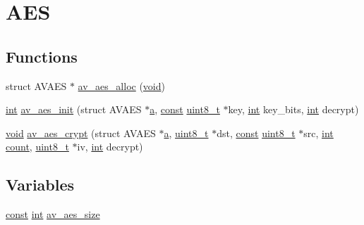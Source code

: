 \hypertarget{group__lavu__aes}{}\section{A\+ES}
\label{group__lavu__aes}
\subsection*{Functions}
\begin{DoxyCompactItemize}
\item 
struct A\+V\+A\+ES $\ast$ \hyperlink{group__lavu__aes_ga82fd4287891dc9fe98ecfe26e1a66bbb}{av\+\_\+aes\+\_\+alloc} (\hyperlink{sound_8c_ae35f5844602719cf66324f4de2a658b3}{void})
\item 
\hyperlink{xmltok_8h_a5a0d4a5641ce434f1d23533f2b2e6653}{int} \hyperlink{group__lavu__aes_ga54975ad71f0eab2287e3e94d561d0aa4}{av\+\_\+aes\+\_\+init} (struct A\+V\+A\+ES $\ast$\hyperlink{rfft2d_test_m_l_8m_a4124bc0a9335c27f086f24ba207a4912}{a}, \hyperlink{getopt1_8c_a2c212835823e3c54a8ab6d95c652660e}{const} \hyperlink{lib-src_2ffmpeg_2win32_2stdint_8h_a9a941819355e6f658991890ff66b4b0e}{uint8\+\_\+t} $\ast$key, \hyperlink{xmltok_8h_a5a0d4a5641ce434f1d23533f2b2e6653}{int} key\+\_\+bits, \hyperlink{xmltok_8h_a5a0d4a5641ce434f1d23533f2b2e6653}{int} decrypt)
\item 
\hyperlink{sound_8c_ae35f5844602719cf66324f4de2a658b3}{void} \hyperlink{group__lavu__aes_gae2572febc1bdf0b6dcb8b313da69e06f}{av\+\_\+aes\+\_\+crypt} (struct A\+V\+A\+ES $\ast$\hyperlink{rfft2d_test_m_l_8m_a4124bc0a9335c27f086f24ba207a4912}{a}, \hyperlink{lib-src_2ffmpeg_2win32_2stdint_8h_a9a941819355e6f658991890ff66b4b0e}{uint8\+\_\+t} $\ast$dst, \hyperlink{getopt1_8c_a2c212835823e3c54a8ab6d95c652660e}{const} \hyperlink{lib-src_2ffmpeg_2win32_2stdint_8h_a9a941819355e6f658991890ff66b4b0e}{uint8\+\_\+t} $\ast$src, \hyperlink{xmltok_8h_a5a0d4a5641ce434f1d23533f2b2e6653}{int} \hyperlink{metrics_8c_afea6e77db19a2f8c91419904fe665a3a}{count}, \hyperlink{lib-src_2ffmpeg_2win32_2stdint_8h_a9a941819355e6f658991890ff66b4b0e}{uint8\+\_\+t} $\ast$iv, \hyperlink{xmltok_8h_a5a0d4a5641ce434f1d23533f2b2e6653}{int} decrypt)
\end{DoxyCompactItemize}
\subsection*{Variables}
\begin{DoxyCompactItemize}
\item 
\hyperlink{getopt1_8c_a2c212835823e3c54a8ab6d95c652660e}{const} \hyperlink{xmltok_8h_a5a0d4a5641ce434f1d23533f2b2e6653}{int} \hyperlink{group__lavu__aes_ga33e4afb2c0eb4d7ead8a5b0a7fed4142}{av\+\_\+aes\+\_\+size}
\end{DoxyCompactItemize}


